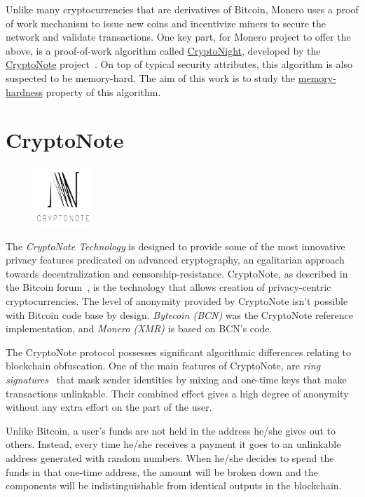 Unlike many cryptocurrencies that are derivatives of Bitcoin, Monero uses a proof of work mechanism to issue new coins and incentivize miners to secure the network and validate transactions. One key part, for Monero project to offer the above, is a proof-of-work algorithm called \hyperref[ch:cryptonight]{CryptoNight}, developed by the \hyperref[sec:CryptoNote]{CryptoNote} project~\cite{citeulike:14139412}. On top of typical security attributes, this algorithm is also suspected to be memory-hard. The aim of this work is to study the \hyperref[sec:memory-hard]{memory-hardness} property of this algorithm.
\clearpage
\pagebreak

\section{CryptoNote} \label{sec:CryptoNote}
\begin{figure}
\centering
\includegraphics[width=0.20\textwidth]{Images/CryptoNote/cryptonote.png}
\end{figure}
The \emph{CryptoNote Technology} is designed to provide some of the most innovative privacy features predicated on advanced cryptography, an egalitarian approach towards decentralization and censorship-resistance. CryptoNote, as described in the Bitcoin forum~\cite{btcforum}, is the technology that allows creation of privacy-centric cryptocurrencies. The level of anonymity provided by CryptoNote isn't possible with Bitcoin code base by design. \emph{Bytecoin (BCN)} was the CryptoNote reference implementation, and \emph{Monero (XMR)} is based on BCN's code.

The CryptoNote protocol possesses significant algorithmic differences relating to blockchain obfuscation. One of the main features of CryptoNote, are \emph{ring signatures}~\cite{citeulike:14139412} that mask sender identities by mixing and one-time keys that make transactions unlinkable. Their combined effect gives a high degree of anonymity without any extra effort on the part of the user.

Unlike Bitcoin, a user's funds are not held in the address he/she gives out to others. Instead, every time he/she receives a payment it goes to an unlinkable address generated with random numbers. When he/she decides to spend the funds in that one-time address, the amount will be broken down and the components will be indistinguishable from identical outputs in the blockchain.

